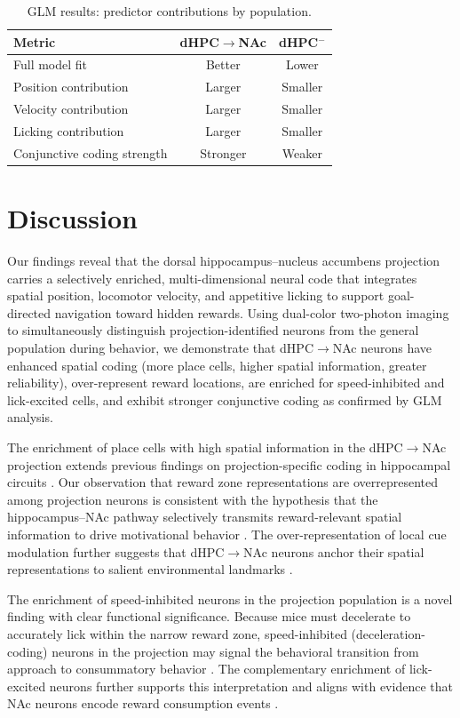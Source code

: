 \documentclass[11pt]{article}
\begin{document}
\begin{table}[H]
\centering
\caption{GLM results: predictor contributions by population.}
\label{tab:glm}
\begin{tabular}{lcc}
\toprule
Metric & dHPC$\to$NAc & dHPC$^-$ \\
\midrule
Full model fit & Better & Lower \\
Position contribution & Larger & Smaller \\
Velocity contribution & Larger & Smaller \\
Licking contribution & Larger & Smaller \\
Conjunctive coding strength & Stronger & Weaker \\
\bottomrule
\end{tabular}
\end{table}

\section{Discussion}

Our findings reveal that the dorsal hippocampus--nucleus accumbens projection carries a selectively enriched, multi-dimensional neural code that integrates spatial position, locomotor velocity, and appetitive licking to support goal-directed navigation toward hidden rewards. Using dual-color two-photon imaging to simultaneously distinguish projection-identified neurons from the general population during behavior, we demonstrate that dHPC$\to$NAc neurons have enhanced spatial coding (more place cells, higher spatial information, greater reliability), over-represent reward locations, are enriched for speed-inhibited and lick-excited cells, and exhibit stronger conjunctive coding as confirmed by GLM analysis.

The enrichment of place cells with high spatial information in the dHPC$\to$NAc projection extends previous findings on projection-specific coding in hippocampal circuits \citep{Ciocchi2015,Xu2016,Trouche2019}. Our observation that reward zone representations are overrepresented among projection neurons is consistent with the hypothesis that the hippocampus--NAc pathway selectively transmits reward-relevant spatial information to drive motivational behavior \citep{Mogenson1980,Floresco2015}. The over-representation of local cue modulation further suggests that dHPC$\to$NAc neurons anchor their spatial representations to salient environmental landmarks \citep{Knierim2002,Hargreaves2007}.

The enrichment of speed-inhibited neurons in the projection population is a novel finding with clear functional significance. Because mice must decelerate to accurately lick within the narrow reward zone, speed-inhibited (deceleration-coding) neurons in the projection may signal the behavioral transition from approach to consummatory behavior \citep{Kropff2015,Hinman2016}. The complementary enrichment of lick-excited neurons further supports this interpretation and aligns with evidence that NAc neurons encode reward consumption events \citep{Roitman2005,Saddoris2015}.
\end{document}
